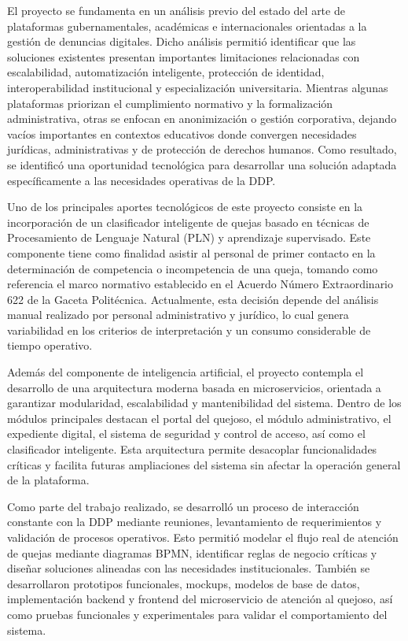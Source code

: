 El proyecto se fundamenta en un análisis previo del estado del arte de plataformas gubernamentales, académicas e internacionales orientadas a la gestión de denuncias digitales. Dicho análisis permitió identificar que las soluciones existentes presentan importantes limitaciones relacionadas con escalabilidad, automatización inteligente, protección de identidad, interoperabilidad institucional y especialización universitaria. Mientras algunas plataformas priorizan el cumplimiento normativo y la formalización administrativa, otras se enfocan en anonimización o gestión corporativa, dejando vacíos importantes en contextos educativos donde convergen necesidades jurídicas, administrativas y de protección de derechos humanos. Como resultado, se identificó una oportunidad tecnológica para desarrollar una solución adaptada específicamente a las necesidades operativas de la DDP.

Uno de los principales aportes tecnológicos de este proyecto consiste en la incorporación de un clasificador inteligente de quejas basado en técnicas de Procesamiento de Lenguaje Natural (PLN) y aprendizaje supervisado. Este componente tiene como finalidad asistir al personal de primer contacto en la determinación de competencia o incompetencia de una queja, tomando como referencia el marco normativo establecido en el Acuerdo Número Extraordinario 622 de la Gaceta Politécnica. Actualmente, esta decisión depende del análisis manual realizado por personal administrativo y jurídico, lo cual genera variabilidad en los criterios de interpretación y un consumo considerable de tiempo operativo.

Además del componente de inteligencia artificial, el proyecto contempla el desarrollo de una arquitectura moderna basada en microservicios, orientada a garantizar modularidad, escalabilidad y mantenibilidad del sistema. Dentro de los módulos principales destacan el portal del quejoso, el módulo administrativo, el expediente digital, el sistema de seguridad y control de acceso, así como el clasificador inteligente. Esta arquitectura permite desacoplar funcionalidades críticas y facilita futuras ampliaciones del sistema sin afectar la operación general de la plataforma.

Como parte del trabajo realizado, se desarrolló un proceso de interacción constante con la DDP mediante reuniones, levantamiento de requerimientos y validación de procesos operativos. Esto permitió modelar el flujo real de atención de quejas mediante diagramas BPMN, identificar reglas de negocio críticas y diseñar soluciones alineadas con las necesidades institucionales. También se desarrollaron prototipos funcionales, mockups, modelos de base de datos, implementación backend y frontend del microservicio de atención al quejoso, así como pruebas funcionales y experimentales para validar el comportamiento del sistema.


